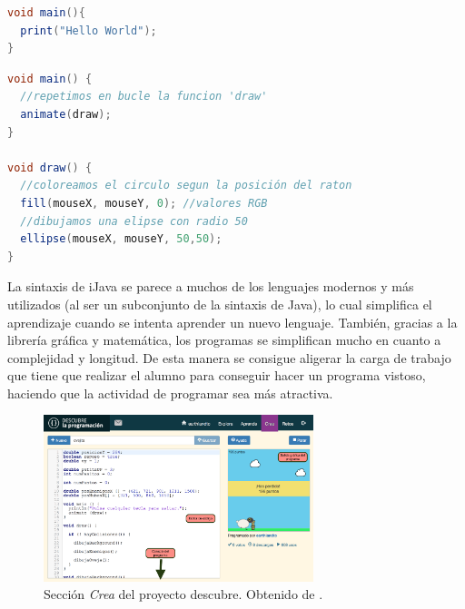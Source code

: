 \begin{lstlisting}[language={Java}, label={code:hello-world}, caption={Programa básico en iJava imprimiendo la cadena "Hello World".}]
void main(){
  print("Hello World");
}
\end{lstlisting}


\begin{lstlisting}[language={Java},label={code:circulos-color-raton}, caption={Programa en iJava que dibuja un circulo de un color diferente según la posición en la pantalla en la que se encuentra el ratón.}]
void main() {
  //repetimos en bucle la funcion 'draw'
  animate(draw);
}

void draw() {
  //coloreamos el circulo segun la posición del raton
  fill(mouseX, mouseY, 0); //valores RGB
  //dibujamos una elipse con radio 50
  ellipse(mouseX, mouseY, 50,50);
}
\end{lstlisting}


La sintaxis de iJava se parece a muchos de los lenguajes modernos y más utilizados (al ser un subconjunto de la sintaxis de Java), lo cual simplifica el aprendizaje cuando se intenta aprender un nuevo lenguaje. También, gracias a la librería gráfica y matemática, los programas se simplifican mucho en cuanto a complejidad y longitud. De esta manera se consigue aligerar la carga de trabajo que tiene que realizar el alumno para conseguir hacer un programa vistoso, haciendo que la actividad de programar sea más atractiva.


\begin{figure}[!ht]
	\begin{centering}
		\includegraphics[width=0.7\textwidth]{images/descubre-crea.png}
				\caption{Sección \emph{Crea} del proyecto \Gls{descubre}. Obtenido de \cite{descubre}.}
				\label{fig:descubre-crea}
	\end{centering}
\end{figure}


